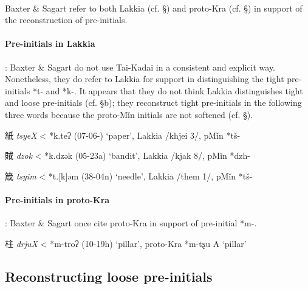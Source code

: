 \paragraph{}Baxter \& Sagart refer to both Lakkia (cf. §) and proto-Kra (cf. §)
in support of the reconstruction of pre-initials.

\paragraph{Pre-initials in Lakkia}:
Baxter \& Sagart do not use Tai-Kadai in a consistent and explicit way.
Nonetheless, they do refer to Lakkia for support in distinguishing the
tight pre-initials *t- and *k-. It appears that they do not think Lakkia
distinguishes tight and loose pre-initials (cf. §b); they reconstruct
tight pre-initials in the following three words because the proto-Mǐn
initials are not softened (cf. §).

\begin{description} \item
紙 \emph{tsyeX} \textless{} *k.teʔ (07-06-) `paper', Lakkia /khjei 3/,
pMǐn *tš-

\item
賊 \emph{dzok} \textless{} *k.dz{}ək (05-23a) `bandit', Lakkia /kjak 8/,
pMǐn *dzh-
\end{description}

箴 \emph{tsyim} \textless{} *t.{[}k]əm (38-04n) `needle', Lakkia /them
1/, pMǐn *tš-

\paragraph{Pre-initials in
proto-Kra}: Baxter \& Sagart once cite proto-Kra in support of
pre-initial *m-.

柱 \emph{drjuX} \textless{} *m-troʔ (10-19h) `pillar', proto-Kra *m-tʂu
A `pillar'

\subsection{Reconstructing loose
pre-initials}

